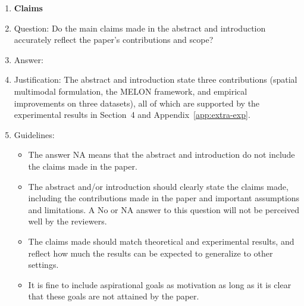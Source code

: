 \documentclass{article}
\theoremstyle{plain}
\theoremstyle{definition}
\begin{document}
\begin{enumerate}

  \item {\bf Claims}
  \item[] Question: Do the main claims made in the abstract and introduction accurately reflect the paper's contributions and scope?
  \item[] Answer: \answerYes{}
  \item[] Justification: The abstract and introduction state three contributions (spatial multimodal formulation, the MELON framework, and empirical improvements on three datasets), all of which are supported by the experimental results in Section~4 and Appendix~\ref{app:extra-exp}.
  \item[] Guidelines:
    \begin{itemize}
      \item The answer NA means that the abstract and introduction do not include the claims made in the paper.
      \item The abstract and/or introduction should clearly state the claims made, including the contributions made in the paper and important assumptions and limitations. A No or NA answer to this question will not be perceived well by the reviewers.
      \item The claims made should match theoretical and experimental results, and reflect how much the results can be expected to generalize to other settings.
      \item It is fine to include aspirational goals as motivation as long as it is clear that these goals are not attained by the paper.
    \end{itemize}


\end{enumerate}
\end{document}
